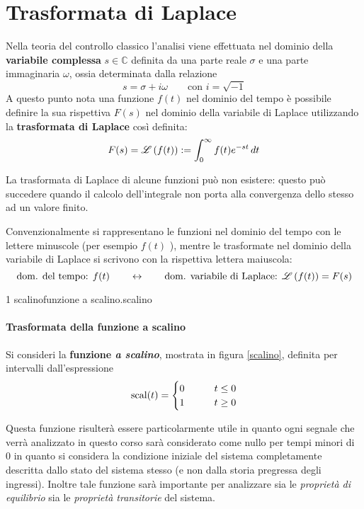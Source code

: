 \section{Trasformata di Laplace}
	\begin{concetto}
		Nella teoria del controllo classico l'analisi viene effettuata nel dominio della \textbf{variabile complessa} $s \in \mathds C$ definita da una parte reale $\sigma$ e una parte immaginaria $\omega$, ossia determinata dalla relazione
		\[ s = \sigma + i \omega \qquad \textrm{con } i = \sqrt{-1} \]  
		A questo punto nota una funzione $f(t)$ nel dominio del tempo è possibile definire la sua rispettiva $F(s)$ nel dominio della variabile di Laplace utilizzando la \textbf{trasformata di Laplace} così definita:
		\begin{equation} \label{teoria:eq:trasformata}
			F(s) = \mathscr L \left( f(t) \right) := \int_0^\infty f(t) e^{-st} \, dt
		\end{equation}		
	\end{concetto}
	\begin{osservazione}
		La trasformata di Laplace di alcune funzioni può non esistere: questo può succedere quando il calcolo dell'integrale non porta alla convergenza dello stesso ad un valore finito.
	\end{osservazione}
	
	Convenzionalmente si rappresentano le funzioni nel dominio del tempo con le lettere minuscole (per esempio $f(t)$ ), mentre le trasformate nel dominio della variabile di Laplace si scrivono con la rispettiva lettera maiuscola:
	\[ \textrm{dom. del tempo: } f(t) \qquad \leftrightarrow \qquad \textrm{dom. variabile di Laplace: }\mathscr L \left( f(t) \right) =F(s)  \]
	
	 1 {scalino}{funzione a scalino.}{scalino}
	\paragraph{Trasformata della funzione a scalino} Si consideri la \textbf{funzione \textit{a scalino}}, mostrata in figura \ref{scalino}, definita per intervalli dall'espressione
	\begin{equation}
	    \textrm{scal}(t)= \begin{cases} 0 \qquad & t \leq 0 \\ 1 \qquad & t \geq 0 \end{cases} 
	\end{equation}
    
    Questa funzione risulterà essere particolarmente utile in quanto ogni segnale che verrà analizzato in questo corso sarà considerato come nullo per tempi minori di 0 in quanto si considera la condizione iniziale del sistema completamente descritta dallo stato del sistema stesso (e non dalla storia pregressa degli ingressi). Inoltre tale funzione sarà importante per analizzare sia le \textit{proprietà di equilibrio} sia le \textit{proprietà transitorie} del sistema.
    
